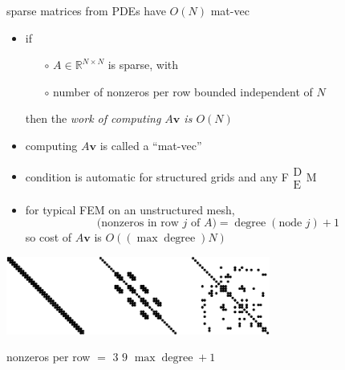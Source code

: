 \documentclass[hide notes,intlimits,usenames,dvipsnames]{beamer}
\newcommand{\RR}{\mathbb{R}}
\newcommand{\bv}{\mathbf{v}}
\newcommand{\FM}{F$\begin{smallmatrix} \text{D} \\ \text{E} \end{smallmatrix}$M\xspace}
\begin{document}
\begin{frame}{sparse matrices from PDEs have $O(N)$ mat-vec}

\begin{itemize}
\item if
    \begin{itemize}
    \item[$\circ$] $A \in \RR^{N\times N}$ is sparse, with
    \item[$\circ$] number of nonzeros per row bounded independent of $N$
    \end{itemize}
then the \emph{work of computing $A \bv$ is $O(N)$}
\item computing $A \bv$ is called a ``mat-vec''
\item condition is automatic for structured grids and any \FM
\item for typical FEM on an unstructured mesh,
   $$\text{(nonzeros in row } j \text{ of } A) = \operatorname{degree}(\text{node } j) + 1$$
so cost of $A\bv$ is $O((\max \operatorname{degree}) N)$
\end{itemize}

\smallskip
\begin{center}
\includegraphics[width=0.65\textwidth]{figs/spythree}

\tiny

nonzeros per row $=$ $3$ \qquad\qquad\qquad $9$ \quad\qquad\qquad\qquad $\max \operatorname{degree} + 1$
\end{center}
\end{frame}
\end{document}
